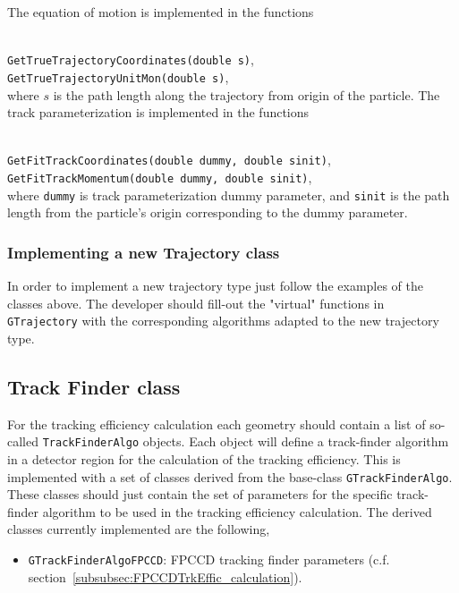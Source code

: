 The equation of motion is implemented in the functions

~\\
\noindent
{\tt GetTrueTrajectoryCoordinates(double s)}, \\
{\tt GetTrueTrajectoryUnitMon(double s)}, \\

\noindent
where $s$ is the path length along the trajectory from origin of the particle. The track parameterization is implemented in the functions 

~\\
\noindent
{\tt GetFitTrackCoordinates(double dummy, double sinit)}, \\
{\tt GetFitTrackMomentum(double dummy, double sinit)}, \\

\noindent
where {\tt dummy} is track parameterization dummy parameter, and {\tt sinit} is the path length from the particle's origin corresponding to the dummy parameter.

\subsubsection{Implementing a new Trajectory class}

In order to implement a new trajectory type just follow the examples of the classes above. The developer should fill-out the "virtual" functions in {\tt GTrajectory} with the 
corresponding algorithms adapted to the new trajectory type.

\subsection{Track Finder class}
\label{subsec:track_finder_class}

For the tracking efficiency calculation each geometry should contain a list of so-called {\tt TrackFinderAlgo} objects. Each object will define a track-finder algorithm in a detector 
region for the calculation of the tracking efficiency. This is implemented with a set of classes derived from the base-class {\tt GTrackFinderAlgo}. These classes should just contain 
the set of parameters for the specific track-finder algorithm to be used in the tracking efficiency calculation. The derived classes currently implemented are the following,

\begin{itemize}
  \item  {\tt GTrackFinderAlgoFPCCD}: FPCCD tracking finder parameters (c.f. section~\ref{subsubsec:FPCCDTrkEffic_calculation}).
\end{itemize}

